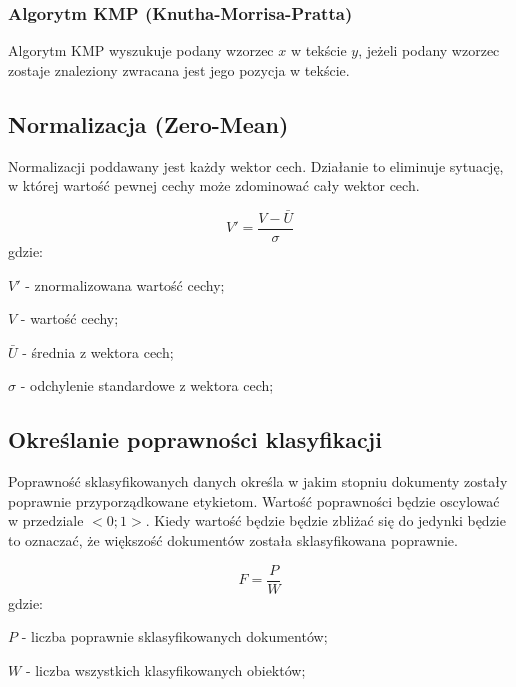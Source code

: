 \documentclass{classrep}
\begin{document}
\subsubsection{Algorytm KMP (Knutha-Morrisa-Pratta)}
Algorytm KMP wyszukuje podany wzorzec $x$ w tekście $y$, jeżeli podany wzorzec zostaje znaleziony zwracana jest jego
pozycja w tekście.

\subsection{Normalizacja (Zero-Mean)}
Normalizacji poddawany jest każdy wektor cech. Działanie to eliminuje sytuację, w której wartość pewnej
cechy może zdominować cały wektor cech.

    \begin{equation}
        V'=\frac{V-\bar{U}}{\sigma}
    \end{equation}
    gdzie:\\
    \begin{description}
        \item $V'$ - znormalizowana wartość cechy;
        \item $V$ - wartość cechy;
        \item $\bar{U}$ - średnia z wektora cech;
        \item $\sigma$ - odchylenie standardowe z wektora cech;
    \end{description}

\subsection{Określanie poprawności klasyfikacji} \label{poprawnosc_klasyfikacji}
Poprawność sklasyfikowanych danych określa w jakim stopniu dokumenty zostały poprawnie przyporządkowane etykietom.
Wartość poprawności będzie oscylować w przedziale $<0;1>$. Kiedy wartość będzie będzie zbliżać się do jedynki będzie
to oznaczać, że większość dokumentów została sklasyfikowana poprawnie.

\begin{equation}
    F=\frac{P}{W}
\end{equation}
gdzie:\\
\begin{description}
    \item $P$ - liczba poprawnie sklasyfikowanych dokumentów;
    \item $W$ - liczba wszystkich klasyfikowanych obiektów;
\end{description}
\end{document}
